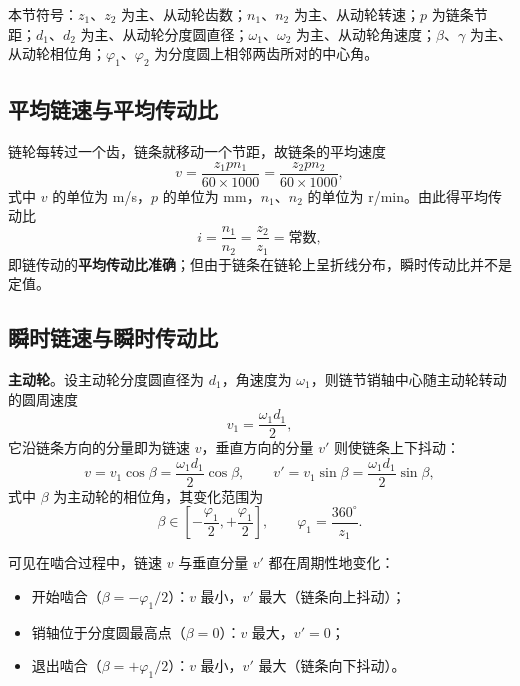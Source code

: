 本节符号：$z_1$、$z_2$ 为主、从动轮齿数；$n_1$、$n_2$ 为主、从动轮转速；$p$ 为链条节距；$d_1$、$d_2$ 为主、从动轮分度圆直径；$\omega_1$、$\omega_2$ 为主、从动轮角速度；$\beta$、$\gamma$ 为主、从动轮相位角；$\varphi_1$、$\varphi_2$ 为分度圆上相邻两齿所对的中心角。

\subsection{平均链速与平均传动比}
链轮每转过一个齿，链条就移动一个节距，故链条的平均速度
\begin{equation}
    v=\frac{z_1pn_1}{60\times1000}=\frac{z_2pn_2}{60\times1000},
    \label{eq:链传动:平均链速}
\end{equation}
式中 $v$ 的单位为 m/s，$p$ 的单位为 mm，$n_1$、$n_2$ 的单位为 r/min。由此得平均传动比
\begin{equation}
    i=\frac{n_1}{n_2}=\frac{z_2}{z_1}=\text{常数},
    \label{eq:链传动:平均传动比}
\end{equation}
即链传动的\textbf{平均传动比准确}；但由于链条在链轮上呈折线分布，瞬时传动比并不是定值。

\subsection{瞬时链速与瞬时传动比}
\textbf{主动轮}。设主动轮分度圆直径为 $d_1$，角速度为 $\omega_1$，则链节销轴中心随主动轮转动的圆周速度
\begin{equation}
    v_1=\frac{\omega_1d_1}{2},
    \label{eq:链传动:主动轮圆周速度}
\end{equation}
它沿链条方向的分量即为链速 $v$，垂直方向的分量 $v'$ 则使链条上下抖动：
\begin{equation}
    v=v_1\cos\beta=\frac{\omega_1d_1}{2}\cos\beta,\qquad
    v'=v_1\sin\beta=\frac{\omega_1d_1}{2}\sin\beta,
    \label{eq:链传动:瞬时链速}
\end{equation}
式中 $\beta$ 为主动轮的相位角，其变化范围为
\begin{equation}
    \beta\in\left[-\frac{\varphi_1}{2},+\frac{\varphi_1}{2}\right],\qquad
    \varphi_1=\frac{360^\circ}{z_1}.
    \label{eq:链传动:主动轮相位角}
\end{equation}

可见在啮合过程中，链速 $v$ 与垂直分量 $v'$ 都在周期性地变化：
\begin{itemize}
    \item 开始啮合（$\beta=-\varphi_1/2$）：$v$ 最小，$v'$ 最大（链条向上抖动）；
    \item 销轴位于分度圆最高点（$\beta=0$）：$v$ 最大，$v'=0$；
    \item 退出啮合（$\beta=+\varphi_1/2$）：$v$ 最小，$v'$ 最大（链条向下抖动）。
\end{itemize}

